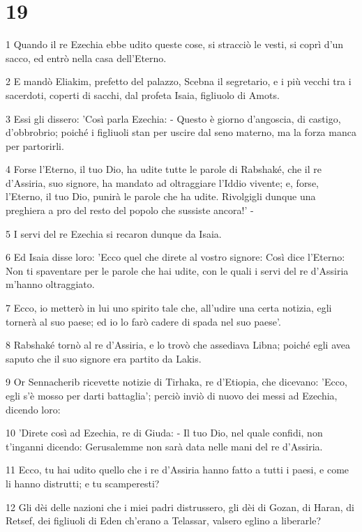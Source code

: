 \chapter{19}

\par 1 Quando il re Ezechia ebbe udito queste cose, si stracciò le vesti, si coprì d'un sacco, ed entrò nella casa dell'Eterno.
\par 2 E mandò Eliakim, prefetto del palazzo, Scebna il segretario, e i più vecchi tra i sacerdoti, coperti di sacchi, dal profeta Isaia, figliuolo di Amots.
\par 3 Essi gli dissero: 'Così parla Ezechia: - Questo è giorno d'angoscia, di castigo, d'obbrobrio; poiché i figliuoli stan per uscire dal seno materno, ma la forza manca per partorirli.
\par 4 Forse l'Eterno, il tuo Dio, ha udite tutte le parole di Rabshaké, che il re d'Assiria, suo signore, ha mandato ad oltraggiare l'Iddio vivente; e, forse, l'Eterno, il tuo Dio, punirà le parole che ha udite. Rivolgigli dunque una preghiera a pro del resto del popolo che sussiste ancora!' -
\par 5 I servi del re Ezechia si recaron dunque da Isaia.
\par 6 Ed Isaia disse loro: 'Ecco quel che direte al vostro signore: Così dice l'Eterno: Non ti spaventare per le parole che hai udite, con le quali i servi del re d'Assiria m'hanno oltraggiato.
\par 7 Ecco, io metterò in lui uno spirito tale che, all'udire una certa notizia, egli tornerà al suo paese; ed io lo farò cadere di spada nel suo paese'.
\par 8 Rabshaké tornò al re d'Assiria, e lo trovò che assediava Libna; poiché egli avea saputo che il suo signore era partito da Lakis.
\par 9 Or Sennacherib ricevette notizie di Tirhaka, re d'Etiopia, che dicevano: 'Ecco, egli s'è mosso per darti battaglia'; perciò inviò di nuovo dei messi ad Ezechia, dicendo loro:
\par 10 'Direte così ad Ezechia, re di Giuda: - Il tuo Dio, nel quale confidi, non t'inganni dicendo: Gerusalemme non sarà data nelle mani del re d'Assiria.
\par 11 Ecco, tu hai udito quello che i re d'Assiria hanno fatto a tutti i paesi, e come li hanno distrutti; e tu scamperesti?
\par 12 Gli dèi delle nazioni che i miei padri distrussero, gli dèi di Gozan, di Haran, di Retsef, dei figliuoli di Eden ch'erano a Telassar, valsero eglino a liberarle?
